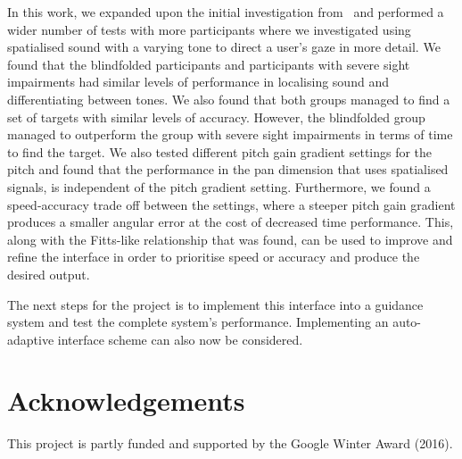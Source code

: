 \documentclass{article}
\begin{document}
In this work, we expanded upon the initial investigation from~\cite{lock2019bone} and performed a wider number of tests with more participants where we investigated using spatialised sound with a varying tone to direct a user's gaze in more detail.
We found that the blindfolded participants and participants with severe sight impairments had similar levels of performance in localising sound and differentiating between tones. 
We also found that both groups managed to find a set of targets with similar levels of accuracy.
However, the blindfolded group managed to outperform the group with severe sight impairments in terms of time to find the target. 
We also tested different pitch gain gradient settings for the pitch and found that the performance in the pan dimension that uses spatialised signals, is independent of the pitch gradient setting.
Furthermore, we found a speed-accuracy trade off between the settings, where a steeper pitch gain gradient produces a smaller angular error at the cost of decreased time performance. 
This, along with the Fitts-like relationship that was found, can be used to improve and refine the interface in order to prioritise speed or accuracy and produce the desired output.

The next steps for the project is to implement this interface into a guidance system and test the complete system's performance. 
Implementing an auto-adaptive interface scheme can also now be considered.

\section{Acknowledgements}

This project is partly funded and supported by the Google Winter Award (2016).



\end{document}
